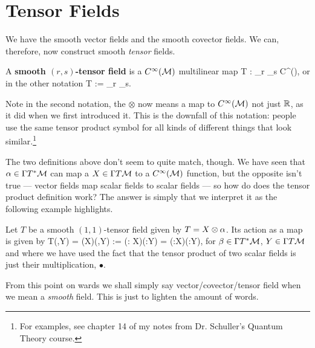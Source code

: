 \section{Tensor Fields}

We have the smooth vector fields and the smooth covector fields. We can, therefore, now construct smooth \textit{tensor} fields. 

    A \textbf{smooth $(r,s)$-tensor field} is a $C^{\infty}(\mathcal{M})$ multilinear map 
    \bse 
        T : _{r} \times {}_{s{}} \lmap C^{\infty}(\cM),
    \ese 
    or in the other notation 
    \bse 
        T := _{r} \times {}_{s{}}.
    \ese 
\ed 

\br 
    Note in the second notation, the $\otimes$ now means a map to $C^{\infty}(\mathcal{M})$ not just $\mathbb{R}$, as it did when we first introduced it. This is the downfall of this notation: people use the same tensor product symbol for all kinds of different things that look similar.\footnote{For examples, see chapter 14 of my notes from Dr. Schuller's Quantum Theory course.} 
\er 

The two definitions above don't seem to quite match, though. We have seen that $\alpha\in\Gamma T^*\mathcal{M}$ can map a $X\in\Gamma T\mathcal{M}$ to a $C^{\infty}(\mathcal{M})$ function, but the opposite isn't true --- vector fields map scalar fields to scalar fields --- so how do does the tensor product definition work? The answer is simply that we interpret it as the following example highlights.

\bex
    Let $T$ be a smooth $(1,1)$-tensor field given by $T = X\otimes \alpha$. Its action as a map is given by 
    \bse 
        T(\beta,Y) = (X\otimes \a)(\beta,Y) := (\beta : X)\otimes (\a:Y) = (\beta:X)\bullet(\a:Y),
    \ese 
    for $\beta\in \Gamma T^*\mathcal{M}$, $Y\in\Gamma T\mathcal{M}$ and where we have used the fact that the tensor product of two scalar fields is just their multiplication, $\bullet$.
\eex 

\br 
    From this point on wards we shall simply say vector/covector/tensor field when we mean a \textit{smooth} field. This is just to lighten the amount of words.
\er